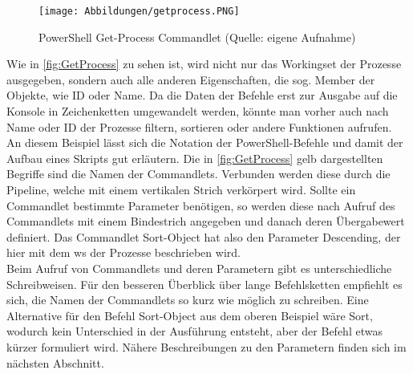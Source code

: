 \begin{figure}[H]
    \centering
    \texttt{[image: Abbildungen/getprocess.PNG]}
    \caption[PowerShell Get-Process Commandlet]{PowerShell Get-Process Commandlet (Quelle: eigene Aufnahme)} 
    \label{fig:GetProcess}
\end{figure}
Wie in \autoref{fig:GetProcess} zu sehen ist, wird nicht nur das Workingset der Prozesse ausgegeben, sondern auch alle anderen Eigenschaften, die sog. Member der Objekte, wie ID oder Name. Da die Daten der Befehle erst zur Ausgabe auf die Konsole in Zeichenketten umgewandelt werden, könnte man vorher auch nach Name oder ID der Prozesse filtern, sortieren oder andere Funktionen aufrufen.\medskip\\
An diesem Beispiel lässt sich die Notation der PowerShell-Befehle und damit der Aufbau eines Skripts gut erläutern. Die in \autoref{fig:GetProcess} gelb dargestellten Begriffe sind die Namen der Commandlets. Verbunden werden diese durch die Pipeline, welche mit einem vertikalen Strich verkörpert wird. Sollte ein Commandlet bestimmte Parameter benötigen, so werden diese nach Aufruf des Commandlets mit einem Bindestrich angegeben und danach deren Übergabewert definiert. Das Commandlet Sort-Object hat also den Parameter Descending, der hier mit dem \acrlong{ws} der Prozesse beschrieben wird.\medskip\\
Beim Aufruf von Commandlets und deren Parametern gibt es unterschiedliche Schreibweisen. Für den besseren Überblick über lange Befehlsketten empfiehlt es sich, die Namen der Commandlets so kurz wie möglich zu schreiben. Eine Alternative für den Befehl Sort-Object aus dem oberen Beispiel wäre Sort, wodurch kein Unterschied in der Ausführung entsteht, aber der Befehl etwas kürzer formuliert wird. Nähere Beschreibungen zu den Parametern finden sich im nächsten Abschnitt.
